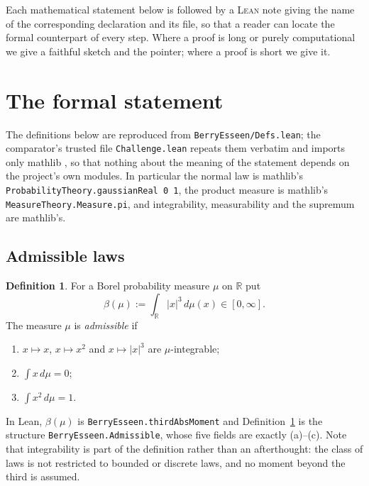 \documentclass[10pt,a4paper]{article}
\theoremstyle{plain}
\theoremstyle{definition}
\newtheorem{definition}[theorem]{Definition}
\newcommand{\R}{\mathbb{R}}
\newcommand{\lean}[1]{\texttt{#1}}
\newcommand{\file}[1]{\texttt{#1}}
\begin{document}
Each mathematical statement below is followed by a \textsc{Lean} note giving
the name of the corresponding declaration and its file, so that a reader can
locate the formal counterpart of every step. Where a proof is long or purely
computational we give a faithful sketch and the pointer; where a proof is short
we give it.

\section{The formal statement}
\label{sec:statement}

The definitions below are reproduced from \file{BerryEsseen/Defs.lean}; the
comparator's trusted file \file{Challenge.lean} repeats them verbatim and
imports only mathlib \cite{Mathlib}, so that nothing about the meaning of the
statement depends on the project's own modules. In particular the normal law is
mathlib's \lean{ProbabilityTheory.gaussianReal 0 1}, the product measure is
mathlib's \lean{MeasureTheory.Measure.pi}, and integrability, measurability and
the supremum are mathlib's.

\subsection{Admissible laws}

\begin{definition}\label{def:admissible}
For a Borel probability measure $\mu$ on $\R$ put
\[
  \beta(\mu) := \int_\R |x|^3\,d\mu(x) \in[0,\infty] .
\]
The measure $\mu$ is \emph{admissible} if
\begin{enumerate}[label=(\alph*),leftmargin=2.4em,itemsep=0pt]
\item $x\mapsto x$, $x\mapsto x^2$ and $x\mapsto|x|^3$ are $\mu$-integrable;
\item $\int x\,d\mu = 0$;
\item $\int x^2\,d\mu = 1$.
\end{enumerate}
\end{definition}

In Lean, $\beta(\mu)$ is \lean{BerryEsseen.thirdAbsMoment} and
Definition~\ref{def:admissible} is the structure
\lean{BerryEsseen.Admissible}, whose five fields are exactly (a)--(c). Note
that integrability is part of the definition rather than an afterthought: the
class of laws is not restricted to bounded or discrete laws, and no moment
beyond the third is assumed.
\end{document}
